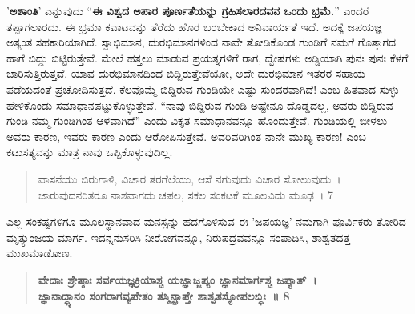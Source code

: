 ’\textbf{ಅಶಾಂತಿ}’ ಎನ್ನುವುದು “\textbf{ಈ ವಿಶ್ವದ ಅಪಾರ ಪೂರ್ಣತೆಯನ್ನು ಗ್ರಹಿಸಲಾರದವನ ಒಂದು ಭ್ರಮೆ.}” ಎಂದರೆ ತಪ್ಪಾಗಲಾರದು. ಈ ಭ್ರಮಾ ಕವಾಟವನ್ನು ತೆರೆದು ಹೊರ ಬರಬೇಕಾದ ಅನಿವಾರ್ಯತೆ ಇದೆ. ಅದಕ್ಕೆ ಜಪಯಜ್ಞ ಅತ್ಯಂತ ಸಹಕಾರಿಯಾಗಿದೆ. ಸ್ವಾಭಿಮಾನ, ದುರಭಿಮಾನಗಳಿಂದ ನಾವೇ ತೋಡಿಕೊಂಡ ಗುಂಡಿಗೆ ನಮಗೆ ಗೊತ್ತಾಗದ ಹಾಗೆ ಬಿದ್ದು ಬಿಟ್ಟಿರುತ್ತೇವೆ. ಮೇಲೆ ಹತ್ತಲು ಮಾಡುವ ಪ್ರಯತ್ನಗಳಿಗೆ ರಾಗ, ದ್ವೇಷಗಳು ಅಡ್ಡಿಯಾಗಿ ಪುನಃ ಪುನಃ ಕೆಳಗೆ ಜಾರಿಸುತ್ತಿರುತ್ತವೆ. ಯಾವ ದುರಭಿಮಾನದಿಂದ ಬಿದ್ದಿರುತ್ತೇವೆಯೋ, ಅದೇ ದುರಭಿಮಾನ ಇತರರ ಸಹಾಯ ಪಡೆಯದಂತೆ ಪ್ರಚೋದಿಸುತ್ತದೆ. ಕೆಲವೊಮ್ಮೆ ಬಿದ್ದಿರುವ ಗುಂಡಿಯೇ ಎಷ್ಟು ಸುಂದರವಾಗಿದೆ! ಎಂಬ ಹಿತವಾದ ಸುಳ್ಳು ಹೇಳಿಕೊಂಡು ಸಮಾಧಾನಪಟ್ಟುಕೊಳ್ಳುತ್ತೇವೆ. “ನಾವು ಬಿದ್ದಿರುವ ಗುಂಡಿ ಅಷ್ಟೇನೂ ದೊಡ್ಡದಲ್ಲ, ಅವರು ಬಿದ್ದಿರುವ ಗುಂಡಿ ನಮ್ಮ ಗುಂಡಿಗಿಂತ ಆಳವಾಗಿದೆ” ಎಂದು ವಿಕೃತ ಸಮಾಧಾನವನ್ನೂ ಹೊಂದುತ್ತೇವೆ. ಗುಂಡಿಯಲ್ಲಿ ಬೀಳಲು ಅವರು ಕಾರಣ, ಇವರು ಕಾರಣ ಎಂದು ಆರೋಪಿಸುತ್ತೇವೆ. ಅವರಿವರಿಗಿಂತ ನಾನೇ ಮುಖ್ಯ ಕಾರಣ! ಎಂಬ ಕಟುಸತ್ಯವನ್ನು ಮಾತ್ರ ನಾವು ಒಪ್ಪಿಕೊಳ್ಳುವುದಿಲ್ಲ.

\begin{verse}
ವಾಸನೆಯು ಬಿರುಗಾಳಿ, ವಿಚಾರ ತರಗೆಲೆಯು, ಆಸೆ ನಗುವುದು ವಿಚಾರ ಸೋಲುವುದು~। \\
ಜಾರುವುದನರಿತರೂ ನಾಶವಾಗದು ಚಪಲ, ಸಕಲ ಸಂಕಟಕೆ ಮೂಲವಿದು ಮೂಢ~। 7
\end{verse}
ಎಲ್ಲ ಸಂಕಷ್ಟಗಳಿಗೂ ಮೂಲಸ್ಥಾನವಾದ ಮನಸ್ಸನ್ನು ಹದಗೊಳಿಸುವ ಈ ’ಜಪಯಜ್ಞ’ ನಮಗಾಗಿ ಪೂರ್ವಿಕರು ತೋರಿದ ಮೃತ್ಯುಂಜಯ ಮಾರ್ಗ. ಇದನ್ನನುಸರಿಸಿ ನೀರೋಗವನ್ನೂ, ನಿರುಪದ್ರವವನ್ನೂ ಸಂಪಾದಿಸಿ, ಶಾಶ್ವತದತ್ತ ಮುಖಮಾಡೋಣ.
\begin{verse}	
\textbf{ವೇದಾಃ ಶ್ರೇಷ್ಠಾಃ ಸರ್ವಯಜ್ಞಕ್ರಿಯಾಶ್ಚ ಯಜ್ಞಾಜ್ಜಪ್ಯಂ ಜ್ಞಾನಮಾರ್ಗಶ್ಚ ಜಪ್ಯಾತ್~। \\
ಜ್ಞಾನಾದ್ಧ್ಯಾನಂ ಸಂಗರಾಗವ್ಯಪೇತಂ ತಸ್ಮಿನ್ಪ್ರಾಪ್ತೇ ಶಾಶ್ವತಸ್ಯೋಪಲಬ್ಧಿಃ~॥ 8}
\end{verse}	

\articleend
